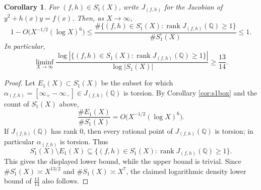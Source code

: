 \documentclass[10pt,a4paper]{amsart}
\newtheorem{corollary}{Corollary}
\begin{document}
\begin{corollary} \label{cor:3} For \((f,h)\in S_1^\square(X)\), write \(J_{(f,h)}\)
for the Jacobian of \(y^2+h(x)y=f(x)\). Then, as \(X\to\infty\),
\[
1-O\bigl(X^{-1/2}(\log X)^6\bigr)
\le
\frac{\#\{(f,h)\in S_1^\square(X): \operatorname{rank} J_{(f,h)}(\mathbb Q)\ge 1\}}
{\#S_1^\square(X)}
\le 1.
\]
In particular,
\[
\liminf_{X\to\infty}
\frac{
\log \left|\{(f,h)\in S_1(X): \operatorname{rank} J_{(f,h)}(\mathbb Q)\ge 1\}\right|
}
{\log |S_1(X)|}
\ge \frac{13}{14}.
\]
\end{corollary}

\begin{proof}
Let \(E_1(X)\subset S_1^\square(X)\) be the subset for which
\(\alpha_{(f,h)}=[\infty_+-\infty_-]\in J_{(f,h)}(\mathbb Q)\) is torsion. By
Corollary \ref{cor:s1box} and the count of \(S_1^\square(X)\) above,
\[
\frac{\#E_1(X)}{\#S_1^\square(X)}
=O\bigl(X^{-1/2}(\log X)^6\bigr).
\]
If \(J_{(f,h)}(\mathbb Q)\) has rank \(0\), then every rational point of
\(J_{(f,h)}(\mathbb Q)\) is torsion; in particular \(\alpha_{(f,h)}\) is torsion.
Thus
\[
S_1^\square(X)\setminus E_1(X)
\subseteq
\{(f,h)\in S_1^\square(X): \operatorname{rank}J_{(f,h)}(\mathbb Q)\ge 1\}.
\]
This gives the displayed lower bound, while the upper bound is trivial. Since
\(\#S_1^\square(X)\asymp X^{13/2}\) and \(\#S_1(X)\asymp X^7\), the claimed logarithmic
density lower bound of \(\frac{13}{14}\) also follows.
\end{proof}
\end{document}
